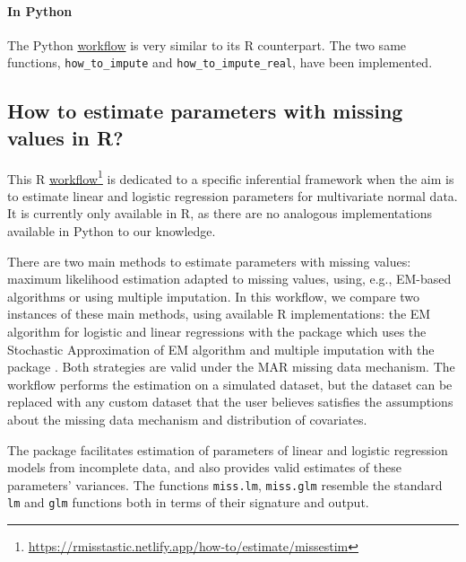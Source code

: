 \paragraph*{In {Python}} The {Python} \href{https://rmisstastic.netlify.app/how-to/python/howtoimpute}{workflow} is very similar to its R counterpart. The two same functions, \texttt{how\_to\_impute} and \texttt{how\_to\_impute\_real}, have been implemented. 


\subsection{How to estimate parameters with missing values in {R}?}

This R \href{https://rmisstastic.netlify.app/how-to/estimate/missestim}{workflow}\footnote{\url{https://rmisstastic.netlify.app/how-to/estimate/missestim}} is dedicated to a specific inferential framework when the aim is to estimate linear and logistic regression parameters for multivariate normal data. It is currently only available in {R}, as there are no analogous implementations available in {Python} to our knowledge. 

There are two main methods to estimate parameters with missing values: maximum likelihood estimation adapted to missing values, using, e.g., EM-based algorithms or using multiple imputation.
In this workflow, we compare two instances of these main methods, using available R implementations: the EM algorithm for logistic and linear regressions with the package  \citep{jiang2020logistic} which uses the Stochastic Approximation of EM algorithm  \citep[SAEM][]{delyon1999convergence} and multiple imputation with the package . Both strategies are valid under the MAR missing data mechanism.
The workflow performs the estimation on a simulated dataset, but the dataset can be replaced with any custom dataset that the user believes satisfies the assumptions about the missing data mechanism and distribution of covariates.

The  package facilitates estimation of parameters of linear and logistic regression models from incomplete data, and also provides valid estimates of these parameters' variances. 
The functions \texttt{miss.lm},  \texttt{miss.glm} resemble the standard \texttt{lm} and \texttt{glm} functions both in terms of their signature and output. 

